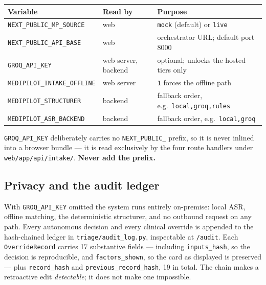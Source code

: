 \documentclass[10pt,a4paper,twocolumn]{article}
\newcommand{\pth}[1]{\textcolor{SecPurple}{\texttt{#1}}}
\newcommand{\cm}[1]{\texttt{#1}}
\begin{document}
\begin{center}\footnotesize\sffamily
\begin{tabular}{@{}p{2.5cm}p{1.5cm}p{3.4cm}@{}}
\toprule
\rowcolor{AccPurple!10}
\textbf{Variable} & \textbf{Read by} & \textbf{Purpose}\\
\midrule
\cm{NEXT\_PUBLIC\_}\newline\cm{MP\_SOURCE} & web & \cm{mock} (default) or \cm{live}\\
\addlinespace[2pt]
\cm{NEXT\_PUBLIC\_}\newline\cm{API\_BASE} & web & orchestrator URL; default port 8000\\
\addlinespace[2pt]
\cm{GROQ\_API\_KEY} & web server, backend & optional; unlocks the hosted tiers only\\
\addlinespace[2pt]
\cm{MEDIPILOT\_}\newline\cm{INTAKE\_OFFLINE} & web server & \cm{1} forces the offline path\\
\addlinespace[2pt]
\cm{MEDIPILOT\_}\newline\cm{STRUCTURER} & backend & fallback order, e.g.\ \cm{local,groq,rules}\\
\addlinespace[2pt]
\cm{MEDIPILOT\_}\newline\cm{ASR\_BACKEND} & backend & fallback order, e.g.\ \cm{local,groq}\\
\bottomrule
\end{tabular}
\end{center}

\vspace{3pt}
\noindent \cm{GROQ\_API\_KEY} deliberately carries no \cm{NEXT\_PUBLIC\_} prefix, so it is never
inlined into a browser bundle --- it is read exclusively by the four route handlers under
\pth{web/app/api/intake/}. \textbf{Never add the prefix.}

\subsection{Privacy and the audit ledger}
With \cm{GROQ\_API\_KEY} omitted the system runs entirely on-premise: local ASR, offline matching,
the deterministic structurer, and no outbound request on any path. Every autonomous decision and
every clinical override is appended to the hash-chained ledger in \pth{triage/audit\_log.py},
inspectable at \pth{/audit}. Each \cm{OverrideRecord} carries 17 substantive fields --- including
\cm{inputs\_hash}, so the decision is reproducible, and \cm{factors\_shown}, so the card as
displayed is preserved --- plus \cm{record\_hash} and \cm{previous\_record\_hash}, 19 in total. The
chain makes a retroactive edit \emph{detectable}; it does not make one impossible.
\end{document}
